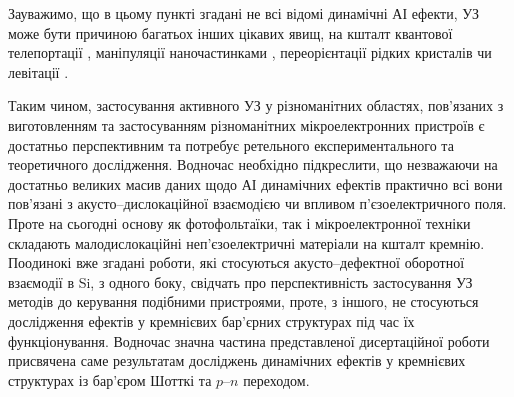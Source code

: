 









Зауважимо, що в цьому пункті згадані не всі відомі динамічні АІ ефекти,
УЗ може бути причиною багатьох інших цікавих явищ, на кшталт квантової телепортації \cite{Buscemi}, маніпуляції наночастинками \cite{Cuberes,Olikh:SPQEO2010}, переорієнтації рідких кристалів \cite{US:levit} чи левітації \cite{US:levit}.

Таким чином, застосування активного УЗ у різноманітних областях, пов'язаних з виготовленням та застосуванням різноманітних мікроелектронних пристроїв є достатньо перспективним та потребує ретельного експериментального та теоретичного дослідження.
Водночас необхідно підкреслити, що незважаючи на достатньо великих масив даних щодо АІ динамічних ефектів практично всі вони пов'язані з акусто--дислокаційної взаємодією чи впливом п'єзоелектричного поля.
Проте на сьогодні основу як фотофольтаїки, так і мікроелектронної техніки складають малодислокаційні неп'єзоелектричні матеріали на кшталт кремнію.
Поодинокі вже згадані роботи, які стосуються акусто--дефектної оборотної взаємодії в Si, з одного боку,
свідчать про перспективність застосування УЗ методів до керування подібними пристроями,
проте, з іншого, не стосуються дослідження ефектів у кремнієвих бар'єрних структурах під час їх функціонування.
Водночас значна частина представленої дисертаційної роботи присвячена саме результатам досліджень динамічних ефектів у кремнієвих структурах із бар'єром Шотткі та $p$--$n$ переходом.


